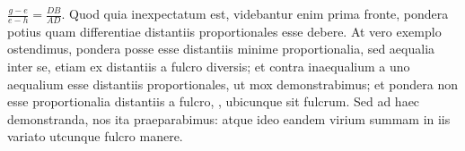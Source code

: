 \rule[-4mm]{0mm}{10mm}$\displaystyle\frac{g-e}{e-h} = \frac{DB}{AD}$.
Quod quia inexpectatum est, videbantur enim prima fronte, pondera potius quam differentiae distantiis proportionales esse debere.
At vero exemplo ostendimus, pondera\protect{} posse esse distantiis minime proportionalia, sed aequalia inter se, etiam ex distantiis a fulcro diversis; et contra  inaequalium a  uno aequalium esse distantiis proportionales, ut mox demonstrabimus; et pondera non esse  proportionalia distantiis a fulcro, , ubicunque sit fulcrum. Sed ad haec demonstranda, nos ita praeparabimus: atque ideo eandem virium summam\protect{} in iis variato utcunque fulcro\protect{} manere.
\pend
\count{}
\count{}
\count{}